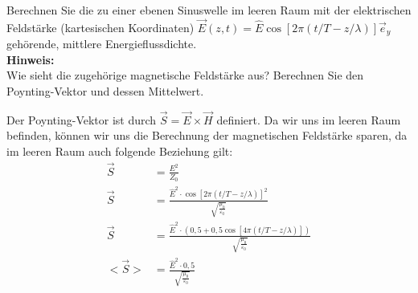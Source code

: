 \begin{question}[section=5,subsection=52,name={Energieflussdichte},difficulty=3,type=exercise,tags={20161207}]
	Berechnen Sie die zu einer ebenen Sinuswelle im leeren Raum mit der elektrischen Feldstärke (kartesischen Koordinaten) $\vec E(z,t) = \hat E \cos[2 \pi (t/T -z/\lambda)] \vec e_y$ gehörende, mittlere Energieflussdichte.
	\\ \textbf{Hinweis:}\\
	Wie sieht die zugehörige magnetische Feldstärke aus? Berechnen Sie den Poynting-Vektor und dessen Mittelwert.
\end{question}
\begin{solution}
	Der Poynting-Vektor ist durch $\vec S = \vec E \times \vec H$ definiert. Da wir uns im leeren Raum befinden, können wir uns die Berechnung der magnetischen Feldstärke sparen, da im leeren Raum auch folgende Beziehung gilt:
	\begin{align}
		\vec S &= \frac{E^2}{Z_0}\\
		\vec S &= \frac{\hat E ^2 \cdot \cos[ 2 \pi (t/T - z/\lambda)]^2}{\sqrt{\frac{\mu_0}{\varepsilon_0}}}\\
		\vec S &= \frac{\hat E ^2 \cdot (0,5 +  0,5 \cos[ 4 \pi (t/T - z/\lambda)])}{\sqrt{\frac{\mu_0}{\varepsilon_0}}}\\
		<\vec S> &= \frac{\hat E ^2 \cdot 0,5}{\sqrt{\frac{\mu_0}{\varepsilon_0}}}
	\end{align}
\end{solution}
